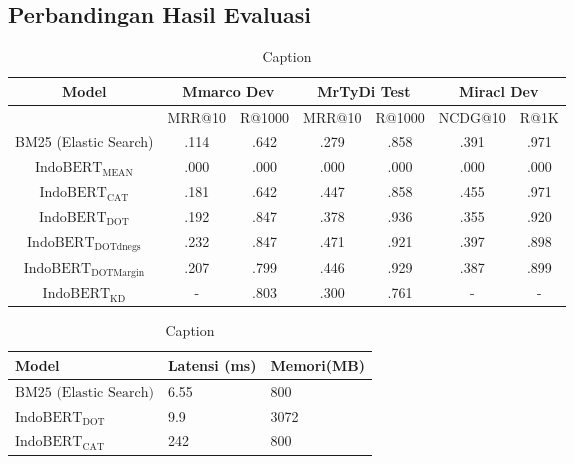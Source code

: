 \subsection{Perbandingan Hasil Evaluasi}
\label{sec:perbandinganhasil}

\begin{table}
    \centering
    \caption{Caption}
    \label{tab:evaluasisemuamodel}
    \begin{tabular}{|c|cc|cc|cc|} \hline 
         Model&  \multicolumn{2}{|c|}{Mmarco Dev}& 
         \multicolumn{2}{|c|}{MrTyDi Test}&  \multicolumn{2}{|c|}{Miracl Dev}\\ \hline 
            & MRR@10 & R@1000 & MRR@10 & R@1000 & NCDG@10 & R@1K\\ \hline 
            BM25 (Elastic Search) & .114 & .642 & .279 & .858 & .391 & .971\\ \hline
            $\text{IndoBERT}_{\text{MEAN}}$ & .000 & .000 & .000 & .000 & .000 & .000\\ \hline
            $\text{IndoBERT}_{\text{CAT}}$ & .181 & .642 & .447 & .858 & .455 & .971\\ \hline
            $\text{IndoBERT}_{\text{DOT}}$ & .192 & .847 & .378 & .936 & .355 & .920\\ \hline
            $\text{IndoBERT}_{\text{DOTdnegs}}$ & .232 & .847 & .471 & .921 & .397 & .898\\ \hline
            $\text{IndoBERT}_{\text{DOTMargin}}$ & .207 & .799 & .446 & .929 & .387 & .899\\ \hline
            $\text{IndoBERT}_{\text{KD}}$ & - & .803 & .300 & .761 & - & -\\ \hline
    \end{tabular}
    
\end{table}


\begin{table}[!ht]
    \centering
    \caption{Caption}
    \label{tab:latensimemori}
    \begin{tabular}{|l|l|l|}
    \hline
    Model                                   & Latensi (ms) & Memori(MB)   \\ \hline
    $\text{BM25 (Elastic Search)}$           &  6.55        &  800         \\ \hline
    $\text{IndoBERT}_{\text{DOT}}$           &  9.9         &   3072        \\ \hline
    $\text{IndoBERT}_{\text{CAT}}$           &  242         &   800        \\ \hline
    \end{tabular}
\end{table}